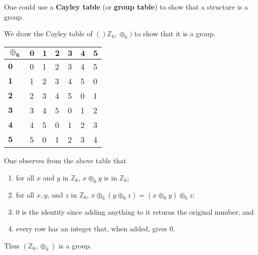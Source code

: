 One could use a \textbf{Cayley table} (or \textbf{group table}) to show that a structure is a group.
\begin{example}
    We draw the Cayley table of $()\mathbb{Z}_6, \oplus_6)$ to show that it is a group.
    \begin{table}[h]
        \centering
        \begin{tabular}{|l|l|l|l|l|l|l|}
        \hline
        $\boldsymbol{\oplus_6}$ & $\boldsymbol{0}$ & $\boldsymbol{1}$ & $\boldsymbol{2}$ & $\boldsymbol{3}$ & $\boldsymbol{4}$ & $\boldsymbol{5}$ \\ \hline
        $\boldsymbol{0}$          & 0          & 1          & 2          & 3          & 4          & 5          \\ \hline
        $\boldsymbol{1}$          & 1          & 2          & 3          & 4          & 5          & 0          \\ \hline
        $\boldsymbol{2}$          & 2          & 3          & 4          & 5          & 0          & 1          \\ \hline
        $\boldsymbol{3}$          & 3          & 4          & 5          & 0          & 1          & 2          \\ \hline
        $\boldsymbol{4}$          & 4          & 5          & 0          & 1          & 2          & 3          \\ \hline
        $\boldsymbol{5}$          & 5          & 0          & 1          & 2          & 3          & 4          \\ \hline
        \end{tabular}
    \end{table}

    One observes from the above table that
    \begin{enumerate}
        \item for all $x$ and $y$ in $\mathbb{Z}_6$, $x \oplus_6 y$ is in $\mathbb{Z}_6$;
        \item for all $x, y$, and $z$ in $\mathbb{Z}_6$, $x \oplus_6 (y \oplus_6 z) = (x \oplus_6 y) \oplus_6 z$;
        \item 0 is the identity since adding anything to it returns the original number; and
        \item every row has an integer that, when added, gives 0.
    \end{enumerate}
    Thus $(\mathbb{Z}_6, \oplus_6)$ is a group.
\end{example}

